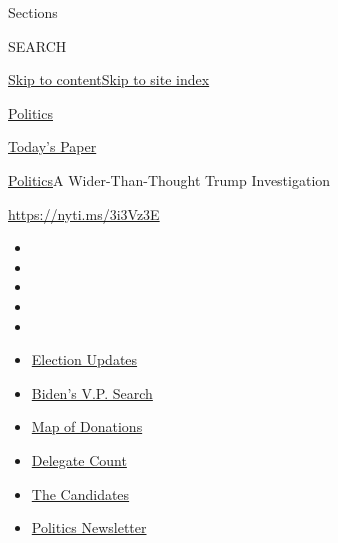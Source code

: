 Sections

SEARCH

\protect\hyperlink{site-content}{Skip to
content}\protect\hyperlink{site-index}{Skip to site index}

\href{https://www.nytimes.com/section/politics}{Politics}

\href{https://myaccount.nytimes.com/auth/login?response_type=cookie\&client_id=vi}{}

\href{https://www.nytimes.com/section/todayspaper}{Today's Paper}

\href{/section/politics}{Politics}\textbar{}A Wider-Than-Thought Trump
Investigation

\url{https://nyti.ms/3i3Vz3E}

\begin{itemize}
\item
\item
\item
\item
\item
\end{itemize}

\begin{itemize}
\item
  \href{https://www.nytimes.com/2020/08/04/us/elections/primary-election-michigan-arizona-kansas.html?action=click\&pgtype=Article\&state=default\&region=TOP_BANNER\&context=storylines_menu}{Election
  Updates}
\item
  \href{https://www.nytimes.com/article/biden-vice-president-2020.html?action=click\&pgtype=Article\&state=default\&region=TOP_BANNER\&context=storylines_menu}{Biden's
  V.P. Search}
\item
  \href{https://www.nytimes.com/interactive/2020/07/24/us/politics/trump-biden-campaign-donors.html?action=click\&pgtype=Article\&state=default\&region=TOP_BANNER\&context=storylines_menu}{Map
  of Donations}
\item
  \href{https://www.nytimes.com/interactive/2020/us/elections/delegate-count-primary-results.html?action=click\&pgtype=Article\&state=default\&region=TOP_BANNER\&context=storylines_menu}{Delegate
  Count}
\item
  \href{https://www.nytimes.com/interactive/2019/us/politics/2020-presidential-candidates.html?action=click\&pgtype=Article\&state=default\&region=TOP_BANNER\&context=storylines_menu}{The
  Candidates}
\item
  \href{https://www.nytimes.com/newsletters/politics?action=click\&pgtype=Article\&state=default\&region=TOP_BANNER\&context=storylines_menu}{Politics
  Newsletter}
\end{itemize}

